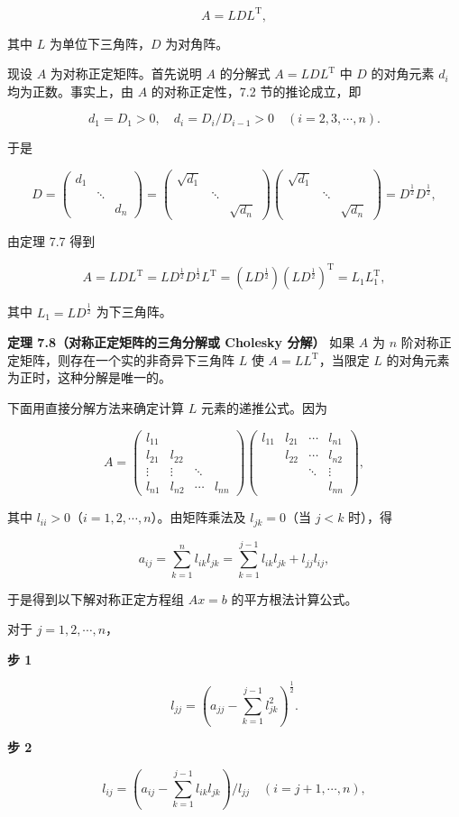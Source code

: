 \[A=LDL^{\mathrm T},\]

其中 \(L\) 为单位下三角阵，\(D\) 为对角阵。

现设 \(A\) 为对称正定矩阵。首先说明 \(A\) 的分解式 \(A=LDL^{\mathrm T}\) 中 \(D\) 的对角元素 \(d_i\) 均为正数。事实上，由 \(A\) 的对称正定性，7.2 节的推论成立，即

\[d_1=D_1>0,\quad d_i=D_i/D_{i-1}>0\quad(i=2,3,\cdots,n).\]

于是

\[
D=\begin{pmatrix}d_1&&\\&\ddots&\\&&d_n\end{pmatrix}
=\begin{pmatrix}\sqrt{d_1}&&\\&\ddots&\\&&\sqrt{d_n}\end{pmatrix}
\begin{pmatrix}\sqrt{d_1}&&\\&\ddots&\\&&\sqrt{d_n}\end{pmatrix}
=D^{\frac12}D^{\frac12},
\]

由定理 7.7 得到

\[A=LDL^{\mathrm T}=LD^{\frac12}D^{\frac12}L^{\mathrm T}=(LD^{\frac12})(LD^{\frac12})^{\mathrm T}=L_1L_1^{\mathrm T},\]

其中 \(L_1=LD^{\frac12}\) 为下三角阵。

\textbf{定理 7.8（对称正定矩阵的三角分解或 Cholesky 分解）} 如果 \(A\) 为 \(n\) 阶对称正定矩阵，则存在一个实的非奇异下三角阵 \(L\) 使 \(A=LL^{\mathrm T}\)，当限定 \(L\) 的对角元素为正时，这种分解是唯一的。

下面用直接分解方法来确定计算 \(L\) 元素的递推公式。因为

\[
A=\begin{pmatrix}
l_{11}&&&\\
l_{21}&l_{22}&&\\
\vdots&\vdots&\ddots&\\
l_{n1}&l_{n2}&\cdots&l_{nn}
\end{pmatrix}
\begin{pmatrix}
l_{11}&l_{21}&\cdots&l_{n1}\\
&l_{22}&\cdots&l_{n2}\\
&&\ddots&\vdots\\
&&&l_{nn}
\end{pmatrix},
\]

其中 \(l_{ii}>0\)（\(i=1,2,\cdots,n\)）。由矩阵乘法及 \(l_{jk}=0\)（当 \(j<k\) 时），得

\[a_{ij}=\sum_{k=1}^{n}l_{ik}l_{jk}=\sum_{k=1}^{j-1}l_{ik}l_{jk}+l_{jj}l_{ij},\]

于是得到以下解对称正定方程组 \(Ax=b\) 的平方根法计算公式。

对于 \(j=1,2,\cdots,n\)，

\textbf{步 1}

\[l_{jj}=\left(a_{jj}-\sum_{k=1}^{j-1}l_{jk}^2\right)^{\frac12}.\tag{7.4.7}\]

\textbf{步 2}

\[l_{ij}=\left(a_{ij}-\sum_{k=1}^{j-1}l_{ik}l_{jk}\right)/l_{jj}\quad(i=j+1,\cdots,n),\]

